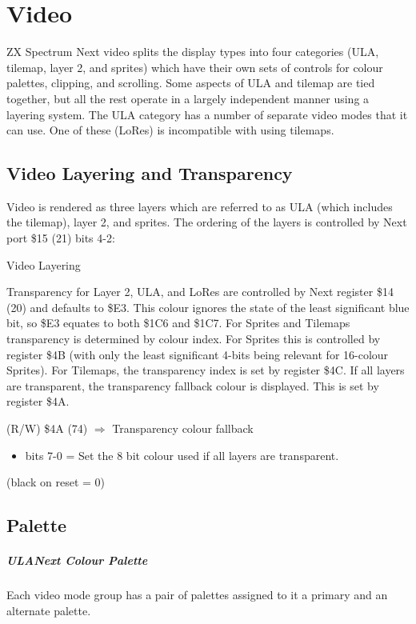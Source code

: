 \chapter{Video}

ZX Spectrum Next video splits the display types into four categories
(ULA, tilemap, layer 2, and sprites) which have their own sets of
controls for colour palettes, clipping, and scrolling. Some aspects of
ULA and tilemap are tied together, but all the rest operate in a
largely independent manner using a layering system. The ULA category
has a number of separate video modes that it can use. One of these
(LoRes) is incompatible with using tilemaps.

\section{Video Layering and Transparency}
Video is rendered as three layers which are referred to as ULA (which
includes the tilemap), layer 2, and sprites.  The ordering of the
layers is controlled by Next port \$15 (21) bits 4-2:

\begin{table}[h]\centering
  \caption{Video Layering}
\end{table}

Transparency for Layer 2, ULA, and LoRes are controlled by Next
register \$14 (20) and defaults to \$E3. This colour ignores the state
of the least significant blue bit, so \$E3 equates to both \$1C6 and
\$1C7. For Sprites and Tilemaps transparency is determined by colour
index. For Sprites this is controlled by register \$4B (with only the
least significant 4-bits being relevant for 16-colour Sprites). For
Tilemaps, the transparency index is set by register \$4C. If all
layers are transparent, the transparency fallback colour is
displayed. This is set by register \$4A.

(R/W) \$4A (74) $\Rightarrow$ Transparency colour fallback
\begin{itemize}
\item[] bits 7-0 = Set the 8 bit colour used if all layers are transparent.
\end{itemize}
(black on reset = 0)

\section{Palette}
\paragraph{ULANext Colour Palette}
Each video mode group has a pair of palettes assigned to it a primary
and an alternate palette.

